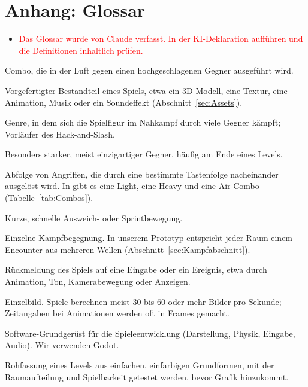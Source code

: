 \documentclass[../Main.tex]{subfiles}
\begin{document}
\newpage
\section{Anhang: Glossar} \label{sec:Glossar}

\begin{itemize}[leftmargin=1.5cm]
    \item \textcolor{red}{Das Glossar wurde von Claude verfasst. In der KI-Deklaration aufführen und die Definitionen inhaltlich prüfen.}
\end{itemize}

\begin{description}[style=unboxed, leftmargin=0cm, itemsep=0.3em]
    \item[Air Combo] Combo, die in der Luft gegen einen hochgeschlagenen Gegner ausgeführt wird.
    \item[Asset] Vorgefertigter Bestandteil eines Spiels, etwa ein 3D-Modell, eine Textur, eine Animation, Musik oder ein Soundeffekt (Abschnitt~\ref{sec:Assets}).
    \item[Beat 'em up] Genre, in dem sich die Spielfigur im Nahkampf durch viele Gegner kämpft; Vorläufer des Hack-and-Slash.
    \item[Bossgegner] Besonders starker, meist einzigartiger Gegner, häufig am Ende eines Levels.
    \item[Combo] Abfolge von Angriffen, die durch eine bestimmte Tastenfolge nacheinander ausgelöst wird. In  gibt es eine Light, eine Heavy und eine Air Combo (Tabelle~\ref{tab:Combos}).
    \item[Dash] Kurze, schnelle Ausweich- oder Sprintbewegung.
    \item[Encounter] Einzelne Kampfbegegnung. In unserem Prototyp entspricht jeder Raum einem Encounter aus mehreren Wellen (Abschnitt~\ref{sec:Kampfabschnitt}).
    \item[Feedback] Rückmeldung des Spiels auf eine Eingabe oder ein Ereignis, etwa durch Animation, Ton, Kamerabewegung oder Anzeigen.
    \item[Frame] Einzelbild. Spiele berechnen meist 30 bis 60 oder mehr Bilder pro Sekunde; Zeitangaben bei Animationen werden oft in Frames gemacht.
    \item[Game Engine] Software-Grundgerüst für die Spieleentwicklung (Darstellung, Physik, Eingabe, Audio). Wir verwenden Godot.
    \item[Greybox] Rohfassung eines Levels aus einfachen, einfarbigen Grundformen, mit der Raumaufteilung und Spielbarkeit getestet werden, bevor Grafik hinzukommt.

\end{description}
\end{document}
